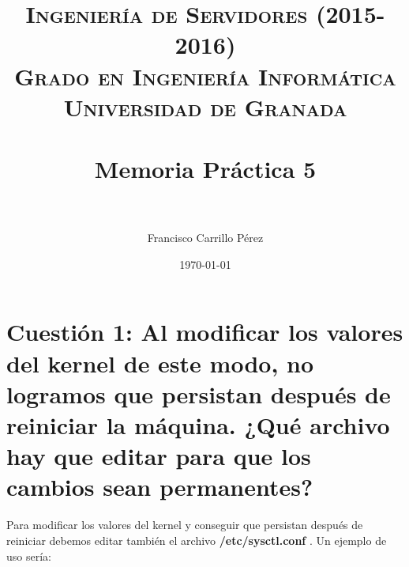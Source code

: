 

\title{	
\normalfont \normalsize 
\textsc{{\bf Ingeniería de Servidores (2015-2016)} \\ Grado en Ingeniería Informática \\ Universidad de Granada} \\ [25pt] %
\horrule{0.5pt} \\[0.4cm] %
\huge Memoria Práctica 5 \\ %
\horrule{2pt} \\[0.5cm] %
}

\author{Francisco Carrillo Pérez} %

\date{\normalsize\today} %




\maketitle %

\newpage %

\tableofcontents %

\listoffigures

\listoftables

\newpage


\section{Cuestión 1: Al modificar los valores del kernel de este modo, no logramos que persistan después de reiniciar la máquina. ¿Qué archivo hay que editar para que los cambios sean permanentes?}

Para modificar los valores del kernel y conseguir que persistan después de reiniciar debemos editar también el archivo \textbf{/etc/sysctl.conf } \cite{systcl1} . Un ejemplo de uso sería:

